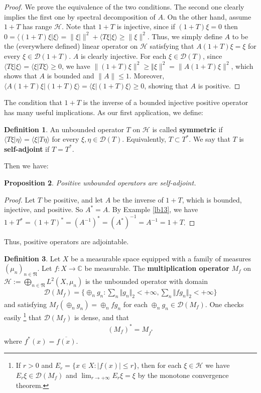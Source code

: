 \documentclass[12pt,b5paper,notitlepage]{article}
\theoremstyle{definition}
\newtheorem{df}{Definition}[section]
\theoremstyle{plain}
\newtheorem{pp}[df]{Proposition}
\newcommand{\fk}{\mathfrak}
\newcommand{\mc}{\mathcal}
\newcommand{\ovl}{\overline}
\newcommand{\Dom}{\scr D}
\newcommand{\bk}[1]{\langle {#1}\rangle}
\newcommand{\scr}{\mathscr}
\newcommand{\Cbb}{\mathbb C}
\numberwithin{equation}{section}
\begin{document}
\begin{proof}
We prove the equivalence of the two conditions. The second one clearly implies the first one by spectral decomposition of $A$. On the other hand, assume $1+T$ has range $\mc H$. Note that $1+T$ is injective, since if $(1+T)\xi=0$ then $0=\bk{(1+T)\xi|\xi}=\lVert\xi|\lVert^2+\bk{T\xi|\xi}\geq \lVert\xi\lVert^2$. Thus, we simply define $A$ to be the (everywhere defined) linear operator on $\mc H$ satisfying that $A(1+T)\xi=\xi$ for every $\xi\in\Dom(1+T)$. $A$ is clearly injective. For each $\xi\in\Dom(T)$, since $\bk{T\xi|\xi}=\bk{\xi|T\xi}\geq 0$, we have $\lVert (1+T)\xi\lVert^2\geq \Vert\xi\lVert^2=\lVert A(1+T)\xi\lVert^2$, which shows that $A$ is bounded and $\lVert A\lVert\leq 1$. Moreover, $\bk{A(1+T)\xi|(1+T)\xi}=\bk{\xi|(1+T)\xi}\geq 0$, showing that $A$ is positive.
\end{proof}



The condition that $1+T$ is the inverse of a bounded injective positive operator has many useful implications. As our first application, we define: 


\begin{df}
An  unbounded operator $T$ on $\mc H$ is called \textbf{symmetric} if $\bk{T\xi|\eta}=\bk{\xi|T\eta}$ for every $\xi,\eta\in\Dom(T)$. Equivalently, $T\subset T^*$. We say that $T$ is \textbf{self-adjoint} if $T=T^*$.
\end{df}

Then we have:
\begin{pp}\label{lb20}
Positive unbounded operators are self-adjoint.
\end{pp}

\begin{proof}
Let $T$ be positive, and let $A$ be the inverse of $1+T$, which is bounded, injective, and positive. So $A^*=A$. By Example \ref{lb13}, we have $1+T^*=(1+T)^*=(A^{-1})^*=(A^*)^{-1}=A^{-1}=1+T$.
\end{proof}



Thus, positive operators are adjointable.




\begin{df}
Let $X$ be a measurable space equipped with a family of measures $(\mu_n)_{n\in\fk N}$. Let $f:X\rightarrow\Cbb$ be measurable. The \textbf{multiplication operator}  $M_f$ on $\mc H:=\bigoplus_{n\in\fk N}L^2(X,\mu_n)$ is the unbounded operator with domain
\begin{align*}
\Dom(M_f)=\Big\{\oplus_n g_n:\sum_n\Vert g_n\Vert_2<+\infty,\sum_n\Vert fg_n\Vert_2<+\infty\Big\}
\end{align*}
and satisfying $M_f(\oplus_n g_n)=\oplus_n fg_n$ for each $\oplus_n g_n\in\Dom(M_f)$. One checks easily \footnote{If $r>0$ and $E_r=\{x\in X:|f(x)|\leq r\}$, then for each $\xi\in\mc H$ we have $E_r\xi\in\Dom(M_f)$ and $\lim_{r\rightarrow+\infty}E_r\xi=\xi$ by the monotone convergence theorem.} that $\Dom(M_f)$ is dense, and that
\begin{align*}
(M_f)^*=M_{f^*}
\end{align*}
where $f^*(x)=\ovl{f(x)}$.
\end{df}
\end{document}
